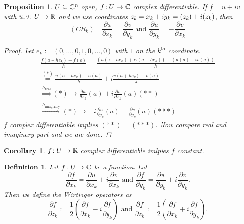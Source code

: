 \documentclass[A4paper, british, reqno]{amsart}
\theoremstyle{darkgreentheorem}
\newtheorem{prop}[thm]{Proposition}
\newtheorem{cor}[thm]{Corollary}
\theoremstyle{darkbluedefinition}
\newtheorem{defn}[thm]{Definition}
\theoremstyle{darkredexample}
\theoremstyle{remark}
\let\Re\relax
\DeclareMathOperator{\Re}{Re}
\let\Im\relax
\DeclareMathOperator{\Im}{Im}
\newcommand{\1}{\mathbbm{1}}
\begin{document}
\begin{prop}
    $U\subseteq \mathbb{C}^{n}$ open, $f\colon U\to \mathbb{C}$ complex differentiable.
    If $f=u+iv$ with $u,v\colon U\to \mathbb{R}$ and we use coordinates $z_{k}=x_{k}+iy_{k}=\Re(z_{k})+i\Im(z_{k})$, then
    \[ (CR_{k}) \quad \frac{\partial u}{\partial x_{k}}=\frac{\partial v}{\partial y_{k}} \text{ and } \frac{\partial u}{\partial y_{k}}=-\frac{\partial v}{\partial x_{k}} \]
    \begin{proof}
	Let $e_{k}:=(0,\ldots,0,1,0,\ldots,0)$ with $1$ on the $k^{\mathrm{th}}$ coordinate.
	\begin{multline*}
	    \frac{f(a+he_{k})-f(a)}{h}=\frac{(u(a+he_{k})+iv(a+he_{k}))-(u(a)+iv(a))}{h} \\
	    \overset{(*)}{=} \frac{u(a+he_{k})-u(a)}{h} + i\frac{v(a+he_{k})-v(a)}{h} \\
	    \overset{h_{\mathrm{real}}}{\Rightarrow } (*)\to \frac{\partial u}{\partial x_{k}}(a)+i\frac{\partial v}{\partial x_{k}}(a) (**) \\
	    \overset{h_{\mathrm{imaginary}}}{\Rightarrow } (*)\to -i\frac{\partial u}{\partial y_{k}}(a)+\frac{\partial v}{\partial y_{k}}(a) (***)
	\end{multline*}
	$f$ complex differentiable implies $(**)=(***)$.
	Now compare real and imaginary part and we are done.
    \end{proof}
\end{prop}

\begin{cor}
    $f\colon U\to \mathbb{R}$ complex differentiable imlpies $f$ constant.
\end{cor}

\begin{defn}
    Let $f\colon U\to \mathbb{C}$ be a function.
    Let
    \[ \frac{\partial f}{\partial x_{k}}=\frac{\partial u}{\partial x_{k}} + i\frac{\partial v}{\partial x_{k}} \text{ and } \frac{\partial f}{\partial y_{k}}=\frac{\partial u}{\partial y_{k}}+i\frac{\partial v}{\partial y_{k}}. \]
    Then we define the \textit{Wirtinger operators} as
    \[ \frac{\partial f}{\partial z_{k}}:=\frac{1}{2}\left( \frac{\partial f}{\partial x_{k}}-i\frac{\partial f}{\partial y_{k}} \right) \text{ and } \frac{\partial f}{\partial \bar{z}_{k}}:=\frac{1}{2}\left( \frac{\partial f}{\partial x_{k}}+i\frac{\partial f}{\partial y_{k}}\right).\]
\end{defn}
\end{document}
